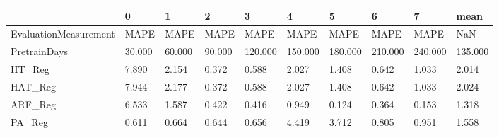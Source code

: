 \begin{tabular}{llllllllll}
\toprule
{} &      0 &      1 &      2 &       3 &       4 &       5 &       6 &       7 &    mean \\
\midrule
EvaluationMeasurement &   MAPE &   MAPE &   MAPE &    MAPE &    MAPE &    MAPE &    MAPE &    MAPE &     NaN \\
PretrainDays          & 30.000 & 60.000 & 90.000 & 120.000 & 150.000 & 180.000 & 210.000 & 240.000 & 135.000 \\
HT\_Reg                &  7.890 &  2.154 &  0.372 &   0.588 &   2.027 &   1.408 &   0.642 &   1.033 &   2.014 \\
HAT\_Reg               &  7.944 &  2.177 &  0.372 &   0.588 &   2.027 &   1.408 &   0.642 &   1.033 &   2.024 \\
ARF\_Reg               &  6.533 &  1.587 &  0.422 &   0.416 &   0.949 &   0.124 &   0.364 &   0.153 &   1.318 \\
PA\_Reg                &  0.611 &  0.664 &  0.644 &   0.656 &   4.419 &   3.712 &   0.805 &   0.951 &   1.558 \\
\bottomrule
\end{tabular}
